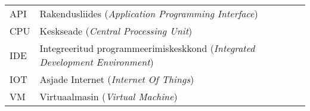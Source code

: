 \begin{longtable}{p{3cm}p{10cm}}  %
API&Rakendusliides (\textit{Application Programming Interface})\\ %
CPU&Keskseade (\textit{Central Processing Unit})\\ %
IDE&Integreeritud programmeerimiskeskkond (\textit{Integrated Development Environment})\\
IOT&Asjade Internet (\textit{Internet Of Things})\\
VM&Virtuaalmasin (\textit{Virtual Machine})\\
\end{longtable}
\addtocounter{table}{-1} %